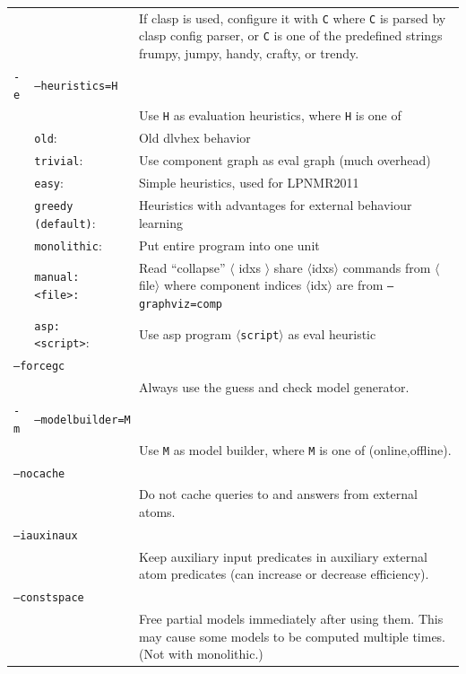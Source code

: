 \documentclass[a4paper, titlepage]{article}
\begin{document}
\begin{center}
\begin{longtable}{p{0.7cm}  p{2.2cm} p{0.3cm} p{6.3cm}  }
& & & If clasp is used, configure it with \texttt{C} where \texttt{C} is parsed by clasp config parser, or \texttt{C} is one of the predefined strings frumpy, jumpy, handy, crafty, or trendy.\\
\texttt{-e}& \multicolumn{3}{l}{\texttt{--heuristics=H}}\\
& & & Use \texttt{H} as evaluation heuristics, where \texttt{H} is one of\\
&\texttt{old}:&&Old dlvhex behavior\\
&\texttt{trivial}:&&Use component graph as eval graph (much overhead)\\
&\texttt{easy}:&&Simple heuristics, used for LPNMR2011\\
&\texttt{greedy (default)}:&& Heuristics with advantages for external behaviour learning\\
&\texttt{monolithic}:&& Put entire program into one unit\\
&\texttt{manual:<file>:} &&  Read ``collapse'' $\langle$ idxs $\rangle$ share $\langle$idxs$\rangle$ commands from $\langle$file$\rangle$ where component indices $\langle$idx$\rangle$ are from \texttt{--graphviz=comp}\\
&\texttt{asp:<script>}:&&Use asp program $\langle$\texttt{script}$\rangle$ as eval heuristic\\
\multicolumn{4}{l}{\texttt{--forcegc}}\\
& & & Always use the guess and check model generator.\\
\texttt{-m}& \multicolumn{3}{l}{\texttt{--modelbuilder=M}}\\
& & & Use \texttt{M} as model builder, where \texttt{M} is one of (online,offline).\\
\multicolumn{4}{l}{\texttt{--nocache}}\\
& & &Do not cache queries to and answers from external atoms.\\
\multicolumn{4}{l}{\texttt{--iauxinaux}}\\
& & &Keep auxiliary input predicates in auxiliary external atom predicates (can increase or decrease efficiency).\\
\multicolumn{4}{l}{\texttt{--constspace}}\\
& & &Free partial models immediately after using them. This may cause some models to be computed multiple times. (Not with monolithic.)\\
\end{longtable}
\end{center}
\end{document}

